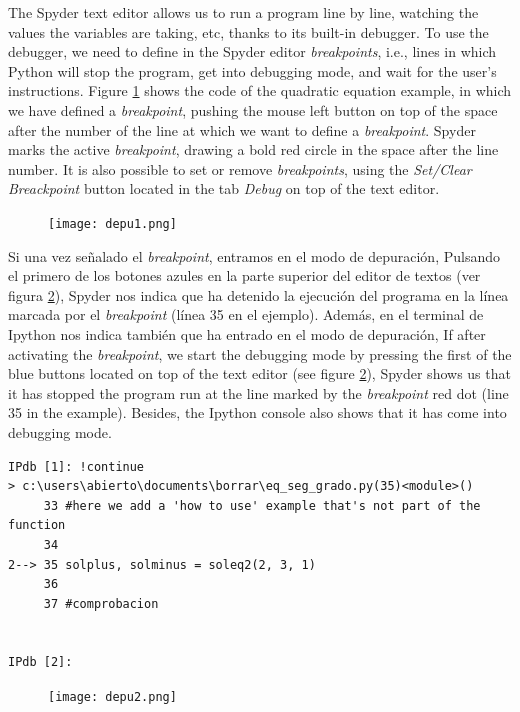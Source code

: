 \begin{paracol}{2}
The Spyder text editor allows us to run a program line by line, watching the values the variables are taking, etc, thanks to its built-in debugger. To use the debugger, we need to define in the Spyder editor \emph{breakpoints}, i.e., lines in which Python will stop the program, get into debugging mode, and wait for the user's instructions. Figure \ref{fig:depu1} shows the code of the quadratic equation example, in which we have defined a \emph{breakpoint}, pushing the mouse left button on top of the space after the number of the line at which we want to define a \emph{breakpoint}. Spyder marks the active \emph{breakpoint}, drawing a bold red circle in the space after the line number. It is also possible to set or remove \emph{breakpoints}, using the \emph{Set/Clear Breackpoint} button located in the tab \emph{Debug} on top of the text editor.
\end{paracol}

\begin{figure}
\centering
\texttt{[image: depu1.png]}
\label{fig:depu1}
\end{figure}

\begin{paracol}{2}
Si una vez señalado el \emph{breakpoint},  entramos en el modo de depuración, Pulsando el primero de los botones azules en la parte superior del editor de textos (ver figura \ref{fig:depu2}),
Spyder nos indica que ha detenido la ejecución del programa en la línea marcada por el \emph{breakpoint} (línea 35 en el ejemplo). Además, en el terminal de Ipython nos indica también que ha entrado en el modo de depuración,
\switchcolumn
If after activating the \emph{breakpoint}, we start the debugging mode by pressing the first of the blue buttons located on top of the text editor (see figure \ref{fig:depu2}), Spyder shows us that it has stopped the program run at the line marked by the \emph{breakpoint} red dot (line 35 in the example). Besides, the Ipython console also shows that it has come into debugging mode.
\end{paracol}
\begin{verbatim}
IPdb [1]: !continue
> c:\users\abierto\documents\borrar\eq_seg_grado.py(35)<module>()
     33 #here we add a 'how to use' example that's not part of the function
     34 
2--> 35 solplus, solminus = soleq2(2, 3, 1)
     36 
     37 #comprobacion


IPdb [2]: 
\end{verbatim}
\begin{figure}
\centering
\texttt{[image: depu2.png]}
\label{fig:depu2}
\end{figure}

